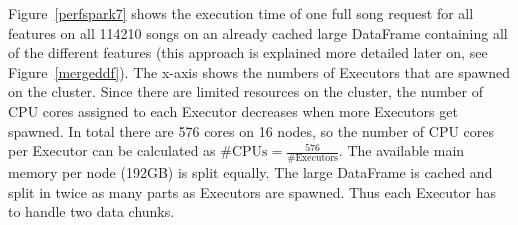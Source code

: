 \noindent Figure~\ref{perfspark7} shows the execution time of one full song request for all features on all 114210 songs on an already cached large DataFrame containing all of the different features (this approach is explained more detailed later on, see Figure~\ref{mergeddf}).
The x-axis shows the numbers of Executors that are spawned on the cluster. Since there are limited resources on the cluster, the number of CPU cores assigned to each Executor decreases when more Executors get spawned. In total there are 576 cores on 16 nodes, so the number of CPU cores per Executor can be calculated as $\#\text{CPUs} = \frac{576}{\#\text{Executors}}$. The available main memory per node (192GB) is split equally. The large DataFrame is cached and split in twice as many parts as Executors are spawned. Thus each Executor has to handle two data chunks.



